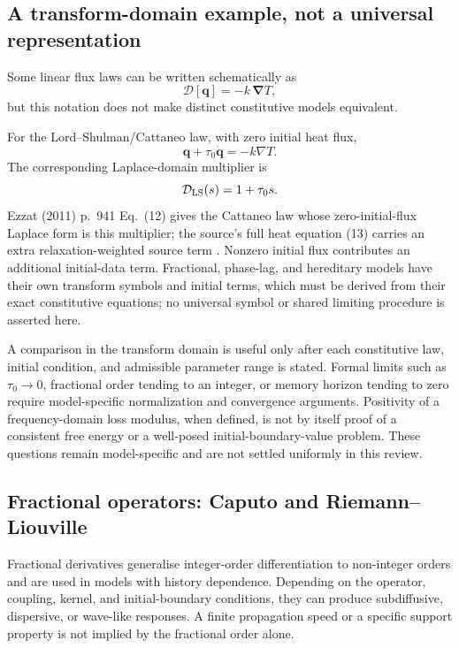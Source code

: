 \subsection{A transform-domain example, not a universal representation}

Some linear flux laws can be written schematically as
\begin{equation}
\mathcal{D}[\bm{q}] = -k\,\bm{\nabla}T,
\label{eq:6.1}
\end{equation}
but this notation does not make distinct constitutive models equivalent.

For the Lord--Shulman/Cattaneo law, with zero initial heat flux,
\begin{equation*}
\bm q+\tau_0\dot{\bm q}=-k\nabla T.
\end{equation*}
The corresponding Laplace-domain multiplier is
\begin{equation}
\mathcal{D}_{\rm LS}(s)=1+\tau_0s.
\label{eq:6.2}
\end{equation}
Ezzat (2011) p.~941 Eq.~(12) gives the Cattaneo law whose zero-initial-flux Laplace form is this multiplier; the source's full heat equation (13) carries an extra relaxation-weighted source term \cite{Ezzat2011}.
Nonzero initial flux contributes an additional initial-data term. Fractional, phase-lag, and hereditary models have their own transform symbols and initial terms, which must be derived from their exact constitutive equations; no universal symbol or shared limiting procedure is asserted here.

A comparison in the transform domain is useful only after each constitutive law, initial condition, and admissible parameter range is stated. Formal limits such as $\tau_0\to0$, fractional order tending to an integer, or memory horizon tending to zero require model-specific normalization and convergence arguments. Positivity of a frequency-domain loss modulus, when defined, is not by itself proof of a consistent free energy or a well-posed initial-boundary-value problem. These questions remain model-specific and are not settled uniformly in this review.

\subsection{Fractional operators: Caputo and Riemann--Liouville}
\label{sec:6.2}

Fractional derivatives generalise integer-order differentiation to non-integer orders and are used in models with history dependence. Depending on the operator, coupling, kernel, and initial-boundary conditions, they can produce subdiffusive, dispersive, or wave-like responses. A finite propagation speed or a specific support property is not implied by the fractional order alone.

